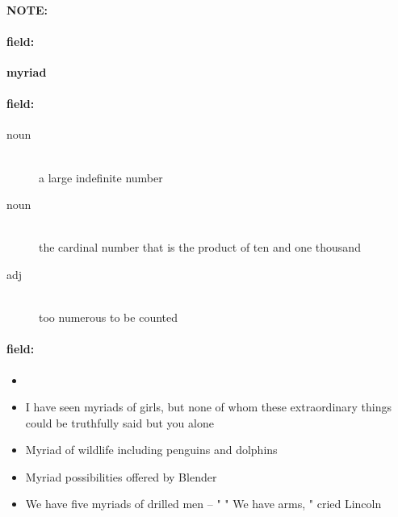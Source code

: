 \documentclass[12pt]{article}
\newenvironment{note}{\paragraph{NOTE:}}{}
\newenvironment{field}{\paragraph{field:}}{}
\begin{document}
\begin{note}
\begin{field}
\textbf{\large myriad}
\end{field}


\begin{field}
\begin{description}
\item[noun] \hfill \\ 
a large indefinite number

\item[noun] \hfill \\ 
the cardinal number that is the product of ten and one thousand

\item[adj] \hfill \\ 
too numerous to be counted

\end{description}
\end{field}

\begin{field}
\begin{itemize}
\item 
\item I have seen myriads of girls, but none of whom these extraordinary things could be truthfully said but you alone
\item Myriad of wildlife including penguins and dolphins
\item Myriad possibilities offered by Blender
\item We have five myriads of drilled men -- " " We have arms, " cried Lincoln
\end{itemize}
\end{field}
\end{note}
\end{document}
